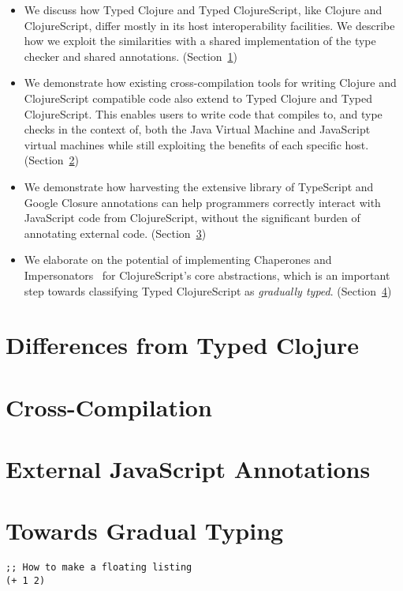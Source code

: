 \documentclass[preprint]{sigplanconf}
\begin{document}
\begin{itemize}
  \item We discuss how Typed Clojure and Typed ClojureScript,
        like Clojure and ClojureScript, differ mostly in its host interoperability facilities.
        We describe how we exploit the similarities with a shared implementation of the
        type checker and shared annotations. (Section~\ref{differences-tc})
  \item We demonstrate how existing cross-compilation tools for writing Clojure and
        ClojureScript compatible code also extend to Typed Clojure and Typed ClojureScript.
        This enables users to write code that compiles to, and type checks in the context of,
        both the Java Virtual Machine and JavaScript virtual machines while still exploiting
        the benefits of each specific host. (Section~\ref{cross-compile})
  \item We demonstrate how harvesting the extensive library of TypeScript
        and Google Closure annotations
        can help programmers correctly interact with JavaScript code from ClojureScript,
        without the significant burden of annotating external code. (Section~\ref{js-ann})
  \item We elaborate on the potential of implementing Chaperones and Impersonators~\cite{strickland2012chaperones}
        for ClojureScript's core abstractions, which is an important step towards
        classifying Typed ClojureScript as \emph{gradually typed}. (Section~\ref{towards-gradual})
\end{itemize}

\section{Differences from Typed Clojure}
\label{differences-tc}

\section{Cross-Compilation}
\label{cross-compile}

\section{External JavaScript Annotations}
\label{js-ann}

\section{Towards Gradual Typing}
\label{towards-gradual}

\begin{lstlisting}[float]
;; How to make a floating listing
(+ 1 2)
\end{lstlisting}

\printbibliography[title=References]
\end{document}
